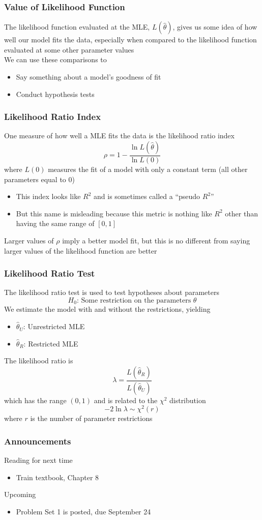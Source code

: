 \documentclass{beamer}
\begin{document}
\begin{frame}\frametitle{Value of Likelihood Function}
    The likelihood function evaluated at the MLE, $L(\hat{\theta})$, gives us some idea of how well our model fits the data, especially when compared to the likelihood function evaluated at some other parameter values \\
    \vspace{3ex}
    We can use these comparisons to 
    \begin{itemize}
        \item Say something about a model's goodness of fit
        \item Conduct hypothesis tests
    \end{itemize}
\end{frame}

\begin{frame}\frametitle{Likelihood Ratio Index}
    One measure of how well a MLE fits the data is the likelihood ratio index
    $$\rho = 1 - \frac{\ln L(\hat{\theta})}{\ln L(0)}$$
    where $L(0)$ measures the fit of a model with only a constant term (all other parameters equal to 0)
    \begin{itemize}
        \item This index looks like $R^2$ and is sometimes called a ``pseudo $R^2$''
        \item But this name is misleading because this metric is nothing like $R^2$ other than having the same range of $[0, 1]$
    \end{itemize}
    \vspace{2ex}
    Larger values of $\rho$ imply a better model fit, but this is no different from saying larger values of the likelihood function are better
\end{frame}

\begin{frame}\frametitle{Likelihood Ratio Test}
    The likelihood ratio test is used to test hypotheses about parameters
    $$H_0 \text{: Some restriction on the parameters } \theta$$
    We estimate the model with and without the restrictions, yielding
    \begin{itemize}
        \item $\hat{\theta}_U$: Unrestricted MLE
        \item $\hat{\theta}_R$: Restricted MLE
    \end{itemize}
    \vspace{2ex}
    The likelihood ratio is
    $$\lambda = \frac{L(\hat{\theta}_R)}{L(\hat{\theta}_U)}$$
    which has the range $(0, 1)$ and is related to the $\chi^2$ distribution
    $$-2 \ln \lambda \sim \chi^2(r)$$
    where $r$ is the number of parameter restrictions
\end{frame}

\begin{frame}\frametitle{Announcements}
    Reading for next time
    \begin{itemize}
        \item Train textbook, Chapter 8
    \end{itemize}
    \vspace{3ex}
    Upcoming
    \begin{itemize}
        \item Problem Set 1 is posted, due September 24
    \end{itemize}
\end{frame}
\end{document}
